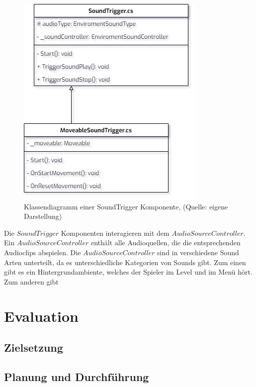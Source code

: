 \begin{figure}[ht]
\centering
\includegraphics[width=1\linewidth]{content/pictures/SoundTrigger.jpg}
\caption{Klassendiagramm einer SoundTrigger Komponente, (Quelle: eigene Darstellung)}
\label{fig:sound-trigger}
\end{figure}

Die $SoundTrigger$ Komponenten interagieren mit dem $AudioSourceController$. Ein $AudioSourceController$ enthält alle Audioquellen, die die entsprechenden Audioclips abspielen. Die $AudioSourceController$ sind in verschiedene Sound Arten unterteilt, da es unterschiedliche Kategorien von Sounds gibt. Zum einen gibt es ein Hintergrundambiente, welches der Spieler im Level und im Menü hört. Zum anderen gibt

\chapter{Evaluation}\label{sec:test}
\section{Zielsetzung}
\section{Planung und Durchführung}
